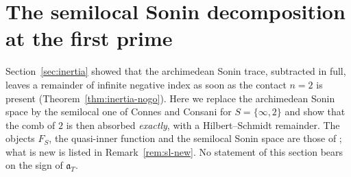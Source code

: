 
\section{The semilocal Sonin decomposition at the first prime}\label{sec:semilocal}

Section~\ref{sec:inertia} showed that the archimedean Sonin trace, subtracted in full, leaves a
remainder of infinite negative index as soon as the contact $n=2$ is present
(Theorem~\ref{thm:inertia-nogo}). Here we replace the archimedean Sonin space by the semilocal one of
Connes and Consani for $S=\{\infty,2\}$ and show that the comb of $2$ is then absorbed \emph{exactly},
with a Hilbert--Schmidt remainder. The objects $F_S$, the quasi-inner function and the semilocal Sonin
space are those of \cite{CCquasi2020,CCM2023}; what is new is listed in Remark~\ref{rem:sl-new}. No
statement of this section bears on the sign of $\mathfrak a_T$.

